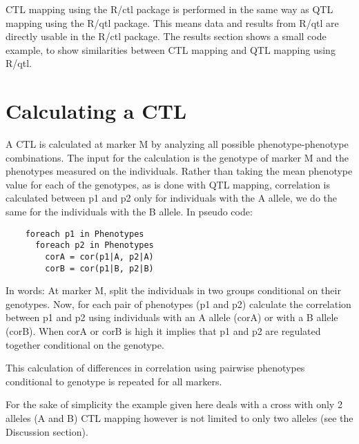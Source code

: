 
  CTL mapping using the R/ctl package is performed in the same way as QTL mapping using the R/qtl\cite{Broman:2003, Arends:2010} 
  package. This means data and results from R/qtl are directly usable in the R/ctl package. The results section shows a small code 
  example, to show similarities between CTL mapping and QTL mapping using R/qtl.

\section{Calculating a CTL}
  A CTL is calculated at marker M by analyzing all possible phenotype-phenotype combinations. The input for the calculation is 
  the genotype of marker M and the phenotypes measured on the individuals. Rather than taking the mean phenotype value for each 
  of the genotypes, as is done with QTL mapping, correlation is calculated between p1 and p2 only for individuals with the 
  A allele, we do the same for the individuals with the B allele. In pseudo code:
\begin{verbatim}
    foreach p1 in Phenotypes
      foreach p2 in Phenotypes
        corA = cor(p1|A, p2|A)
        corB = cor(p1|B, p2|B)
\end{verbatim}
  In words: At marker M, split the individuals in two groups conditional on their genotypes. Now, for each pair of phenotypes 
  (p1 and p2) calculate the correlation between p1 and p2 using individuals with an A allele (corA) or with a B allele (corB). 
  When corA or corB is high it implies that p1 and p2 are regulated together conditional on the genotype.

  This calculation of differences in correlation using pairwise phenotypes conditional to genotype is repeated for all markers.

  For the sake of simplicity the example given here deals with a cross with only 2 alleles (A and B) CTL mapping however is not 
  limited to only two alleles (see the Discussion section).

